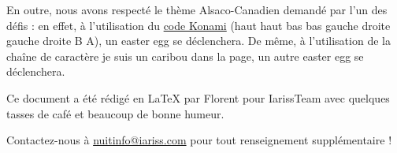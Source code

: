 \documentclass[12pt, a4paper]{article}
\newcommand{\espace}{\vspace{.8cm}}
\newcommand{\authors}{Florent}
\begin{document}
En outre, nous avons respecté le thème Alsaco-Canadien demandé par l'un des défis : en effet, à l'utilisation du \href{http://fr.wikipedia.org/wiki/Code_Konami}{code Konami} (haut haut bas bas gauche droite gauche droite B A), un easter egg se déclenchera. De même, à l'utilisation de la chaîne de caractère \og{}je suis un caribou\fg{} dans la page, un autre easter egg se déclenchera.



\espace\vfill{}
Ce document a été rédigé en \LaTeX{} par \authors{} pour IarissTeam avec quelques tasses de café et beaucoup de bonne humeur.

Contactez-nous à \href{mailto:nuitinfo@iariss.com}{nuitinfo@iariss.com} pour tout renseignement supplémentaire !
\end{document}
